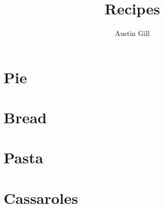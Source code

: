 \documentclass{article}
\title{Recipes}
\author{Austin Gill}
\begin{document}
    \maketitle
    \tableofcontents


    \newpage
    \section{Pie}
        

    \newpage
    \section{Bread}
        

    \newpage
    \section{Pasta}
        

    \newpage
    \section{Cassaroles}
        
\end{document}
